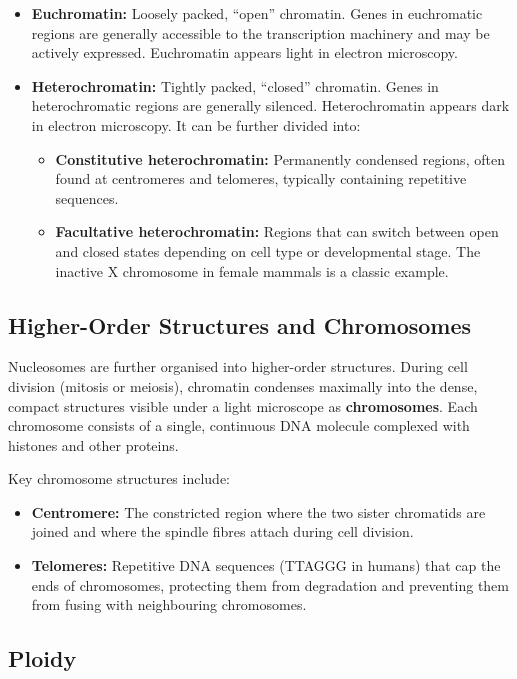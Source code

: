 \begin{itemize}[itemsep=2pt]
  \item \textbf{Euchromatin:} Loosely packed, ``open'' chromatin. Genes in euchromatic regions are generally accessible to the transcription machinery and may be actively expressed. Euchromatin appears light in electron microscopy.
  \item \textbf{Heterochromatin:} Tightly packed, ``closed'' chromatin. Genes in heterochromatic regions are generally silenced. Heterochromatin appears dark in electron microscopy. It can be further divided into:
  \begin{itemize}
    \item \textbf{Constitutive heterochromatin:} Permanently condensed regions, often found at centromeres and telomeres, typically containing repetitive sequences.
    \item \textbf{Facultative heterochromatin:} Regions that can switch between open and closed states depending on cell type or developmental stage. The inactive X chromosome in female mammals is a classic example.
  \end{itemize}
\end{itemize}

\subsection{Higher-Order Structures and Chromosomes}
\label{subsec:molbio:chromosomes}

Nucleosomes are further organised into higher-order structures. During cell division (mitosis or meiosis), chromatin condenses maximally into the dense, compact structures visible under a light microscope as \textbf{chromosomes}. Each chromosome consists of a single, continuous DNA molecule complexed with histones and other proteins.

Key chromosome structures include:
\begin{itemize}[itemsep=2pt]
  \item \textbf{Centromere:} The constricted region where the two sister chromatids are joined and where the spindle fibres attach during cell division.
  \item \textbf{Telomeres:} Repetitive DNA sequences (TTAGGG in humans) that cap the ends of chromosomes, protecting them from degradation and preventing them from fusing with neighbouring chromosomes.
\end{itemize}

\subsection{Ploidy}
\label{subsec:molbio:ploidy}

